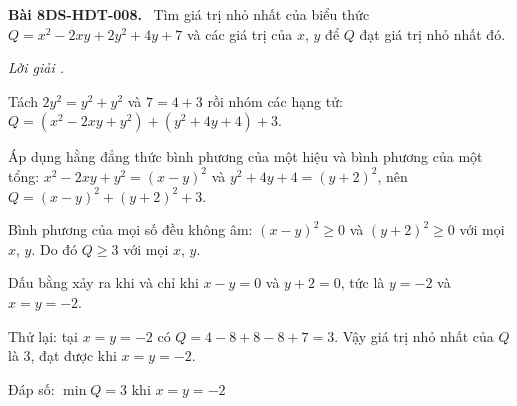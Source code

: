 \documentclass[12pt,a4paper]{article}
\newenvironment{problem}[1][]{\par\medskip\noindent\textbf{Bài #1.}\ }{\par}
\newenvironment{solution}[1][]{\par\noindent\textit{Lời giải #1.}\par}{\par}
\begin{document}
\begin{problem}[8DS-HDT-008]
Tìm giá trị nhỏ nhất của biểu thức $Q = x^2 - 2xy + 2y^2 + 4y + 7$ và các giá trị của $x$, $y$ để $Q$ đạt giá trị nhỏ nhất đó.

\begin{solution}
Tách $2y^2 = y^2 + y^2$ và $7 = 4 + 3$ rồi nhóm các hạng tử: $Q = (x^2 - 2xy + y^2) + (y^2 + 4y + 4) + 3$.

Áp dụng hằng đẳng thức bình phương của một hiệu và bình phương của một tổng: $x^2 - 2xy + y^2 = (x - y)^2$ và $y^2 + 4y + 4 = (y + 2)^2$, nên $Q = (x - y)^2 + (y + 2)^2 + 3$.

Bình phương của mọi số đều không âm: $(x - y)^2 \geq 0$ và $(y + 2)^2 \geq 0$ với mọi $x$, $y$. Do đó $Q \geq 3$ với mọi $x$, $y$.

Dấu bằng xảy ra khi và chỉ khi $x - y = 0$ và $y + 2 = 0$, tức là $y = -2$ và $x = y = -2$.

Thử lại: tại $x = y = -2$ có $Q = 4 - 8 + 8 - 8 + 7 = 3$. Vậy giá trị nhỏ nhất của $Q$ là $3$, đạt được khi $x = y = -2$.

Đáp số: $\boxed{\min Q = 3 \text{ khi } x = y = -2}$
\end{solution}
\end{problem}
\end{document}
